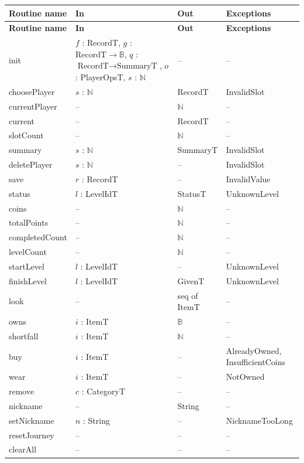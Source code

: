 \documentclass[10pt, titlepage]{article}
\newcommand{\B}{\mathbb{B}}
\newcommand{\N}{\mathbb{N}}
\begin{document}
\begingroup
\small
\begin{longtable}{>{\raggedright\arraybackslash}p{3.0cm}
  >{\raggedright\arraybackslash}p{5.0cm}
  >{\raggedright\arraybackslash}p{2.8cm}
  >{\raggedright\arraybackslash}p{3.4cm}}
\toprule
\textbf{Routine name} & \textbf{In} & \textbf{Out} & \textbf{Exceptions}\\
\midrule
\endfirsthead
\toprule
\textbf{Routine name} & \textbf{In} & \textbf{Out} & \textbf{Exceptions}\\
\midrule
\endhead
\bottomrule
\endfoot
init & $f$ : RecordT, $g$ : $\text{RecordT} \to \B$, $q$ :
$\text{RecordT} \to \text{SummaryT}$, $o$ : PlayerOpsT, $s$ : $\N$ & -- & --\\
choosePlayer & $s$ : $\N$ & RecordT & InvalidSlot\\
currentPlayer & -- & $\N$ & --\\
current & -- & RecordT & --\\
slotCount & -- & $\N$ & --\\
summary & $s$ : $\N$ & SummaryT & InvalidSlot\\
deletePlayer & $s$ : $\N$ & -- & InvalidSlot\\
save & $r$ : RecordT & -- & InvalidValue\\
status & $l$ : LevelIdT & StatusT & UnknownLevel\\
coins & -- & $\N$ & --\\
totalPoints & -- & $\N$ & --\\
completedCount & -- & $\N$ & --\\
levelCount & -- & $\N$ & --\\
startLevel & $l$ : LevelIdT & -- & UnknownLevel\\
finishLevel & $l$ : LevelIdT & GivenT & UnknownLevel\\
look & -- & seq of ItemT & --\\
owns & $i$ : ItemT & $\B$ & --\\
shortfall & $i$ : ItemT & $\N$ & --\\
buy & $i$ : ItemT & -- & AlreadyOwned, InsufficientCoins\\
wear & $i$ : ItemT & -- & NotOwned\\
remove & $c$ : CategoryT & -- & --\\
nickname & -- & String & --\\
setNickname & $n$ : String & -- & NicknameTooLong\\
resetJourney & -- & -- & --\\
clearAll & -- & -- & --\\
\end{longtable}
\endgroup
\end{document}
